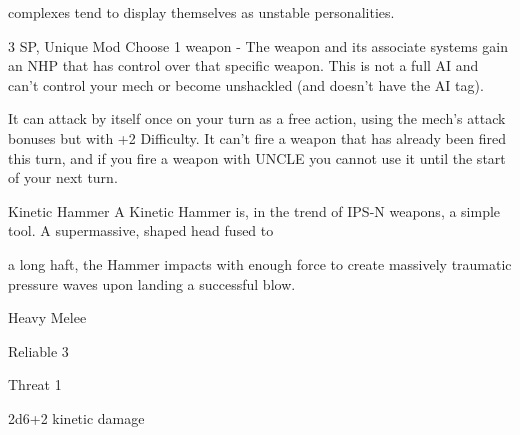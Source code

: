 complexes tend to display themselves as unstable personalities.

3 SP, Unique
Mod
Choose 1 weapon - The weapon and its associate systems gain an NHP that has control over
that specific weapon. This is not a full AI and can’t control your mech or become unshackled
(and doesn’t have the AI tag).


It can attack by itself once on your turn as a free action, using the mech’s attack bonuses but
with +2 Difficulty. It can’t fire a weapon that has already been fired this turn, and if you fire a
weapon with UNCLE you cannot use it until the start of your next turn.


Kinetic Hammer
A Kinetic Hammer is, in the trend of IPS-N weapons, a simple tool. A supermassive, shaped head fused to

a long haft, the Hammer impacts with enough force to create massively traumatic pressure waves upon
landing a successful blow.

Heavy Melee

Reliable 3

Threat 1

2d6+2 kinetic damage

